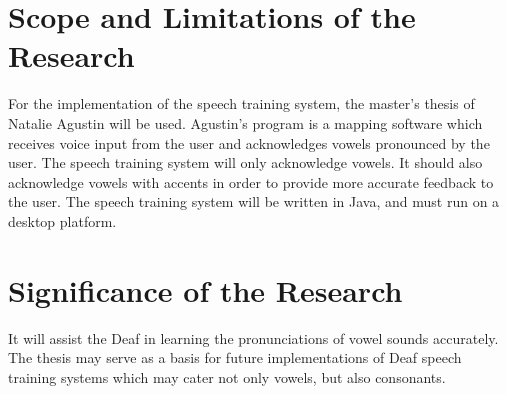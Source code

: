 \section{Scope and Limitations of the Research}
\label{sec:scopelimitations}

For the implementation of the speech training system, the master's thesis of Natalie Agustin \citeyear{agustin:2014:SOM} will be used. Agustin's program is a mapping software which receives voice input from the user and acknowledges vowels pronounced by the user.
The speech training system will only acknowledge vowels. It should also acknowledge vowels with accents in order to provide more accurate feedback to the user.
The speech training system will be written in Java, and must run on a desktop platform.

\section{Significance of the Research}
\label{sec:significance}

It will assist the Deaf in learning the pronunciations of vowel sounds accurately.
The thesis may serve as a basis for future implementations of Deaf speech training systems which may cater not only vowels, but also consonants.